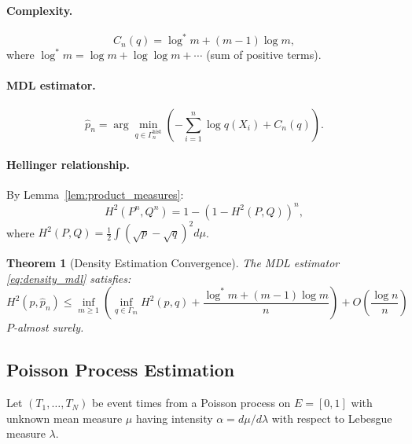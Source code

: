 \documentclass[preprint,review,12pt]{article}
\newtheorem{theorem}{Theorem}[section]
\begin{document}
\paragraph{Complexity.}
\begin{equation}\label{eq:density_complexity}
C_n(q) = \log^* m + (m-1) \log m,
\end{equation}
where $\log^* m = \log m + \log \log m + \cdots$ (sum of positive terms).

\paragraph{MDL estimator.}
\begin{equation}\label{eq:density_mdl}
\hat{p}_n = \arg\min_{q \in \Gamma_n^{\text{hist}}} \left( 
-\sum_{i=1}^n \log q(X_i) + C_n(q) \right).
\end{equation}

\paragraph{Hellinger relationship.} By Lemma~\ref{lem:product_measures}:
\begin{equation}\label{eq:density_hellinger}
H^2(P^n, Q^n) = 1 - (1 - H^2(P, Q))^n,
\end{equation}
where $H^2(P, Q) = \frac{1}{2} \int (\sqrt{p} - \sqrt{q})^2 d\mu$.

\begin{theorem}[Density Estimation Convergence]\label{thm:density}
The MDL estimator \eqref{eq:density_mdl} satisfies:
\begin{equation}\label{eq:density_rate}
	H^2(p, \hat{p}_n) \leq \inf_{m \geq 1} \left( \inf_{q \in \Gamma_m} H^2(p, q) 
	+ \frac{\log^* m + (m-1) \log m}{n} \right) + O\left( \frac{\log n}{n} \right)
\end{equation}
$P$-almost surely.
\end{theorem}

\subsection{Poisson Process Estimation}
\label{subsec:poisson}

Let $(T_1, \ldots, T_N)$ be event times from a Poisson process on $E = [0, 1]$ 
with unknown mean measure $\mu$ having intensity $\alpha = d\mu/d\lambda$ 
with respect to Lebesgue measure $\lambda$.
\end{document}
